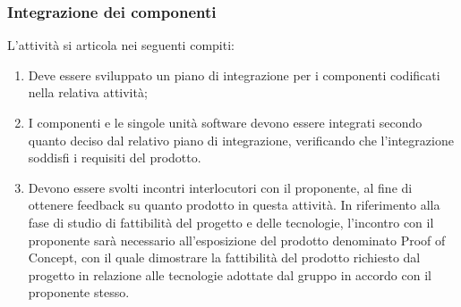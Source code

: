 \subsubsection{Integrazione dei componenti}
L'attività si articola nei seguenti compiti:
\begin{enumerate}
    \item Deve essere sviluppato un piano di integrazione per i componenti codificati nella relativa attività;
    \item I componenti e le singole unità software devono essere integrati secondo quanto deciso dal relativo piano di integrazione, verificando che l'integrazione soddisfi i requisiti del prodotto.
    \item Devono essere svolti incontri interlocutori con il proponente, al fine di ottenere feedback su quanto prodotto in questa attività. In riferimento alla fase di studio di fattibilità del progetto e delle tecnologie, l'incontro con il proponente sarà necessario all'esposizione del prodotto denominato Proof of Concept, con il quale dimostrare la fattibilità del prodotto richiesto dal progetto in relazione alle tecnologie adottate dal gruppo in accordo con il proponente stesso.
\end{enumerate}



